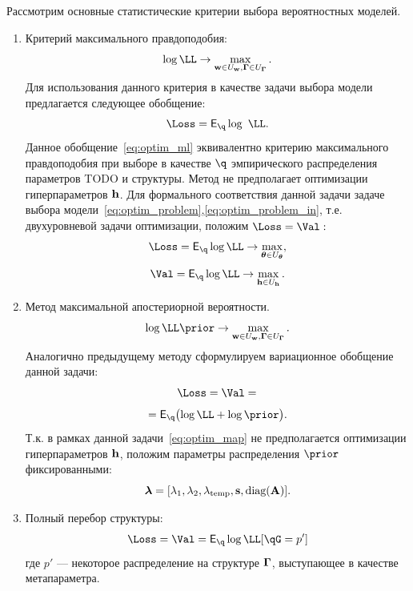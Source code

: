 Рассмотрим основные статистические критерии выбора вероятностных моделей. 
\begin{enumerate}
\item Критерий максимального правдоподобия:
\[\log \LL \to \max_{\w \in \Uw, \G \in \UG}.\]
Для использования данного критерия в качестве задачи выбора модели предлагается следующее обобщение:
\begin{equation}
\label{eq:optim_ml}
    \Loss =  \E_{\q} \log~\LL.
\end{equation}
Данное обобщение~\eqref{eq:optim_ml} эквивалентно  критерию максимального правдоподобия при выборе в качестве $\q$ эмпирического распределения параметров TODO и структуры.
Метод не предполагает оптимизации гиперпараметров $\mathbf{h}$. Для формального соответствия данной задачи задаче выбора модели~\eqref{eq:optim_problem},\eqref{eq:optim_problem_in}, т.е. двухуровневой задачи оптимизации, положим $\Loss=\Val:$
\[
    \Loss =  \E_{\q}\log \LL \to \max_{\teta \in \Uteta},
\]
\[
    \Val =  \E_{\q}\log \LL \to \max_{\h \in \Uh}.
\]



\item Метод максимальной апостериорной вероятности. 
\[\log \LL \prior \to \max_{\w  \in \Uw, \G \in \UG}.\]
Аналогично предыдущему методу сформулируем вариационное обобщение данной задачи:
\begin{equation}
\label{eq:optim_map}
\Loss = \Val = 
\end{equation}
\[
 = \E_{\q} \bigl( \log\LL + \log\prior \bigr).
\]
Т.к. в рамках данной задачи~\eqref{eq:optim_map} не предполагается оптимизации гиперпараметров $\mathbf{h}$, положим параметры распределения $\prior$ фиксированными:
\[
   \boldsymbol{\lambda} = [\lambda_1, \lambda_2, \lambda_{\text{temp}}, \mathbf{s}, \text{diag}(\mathbf{A})].
\]

\item Полный перебор структуры:
\begin{equation}
\label{eq:optim_struct}
    \Loss = \Val = \E_{\q} \log \LL [\qG = p']
\end{equation}
где $p'$ --- некоторое распределение на структуре $\boldsymbol{\Gamma}$, выступающее в качестве метапараметра.





\end{enumerate}
